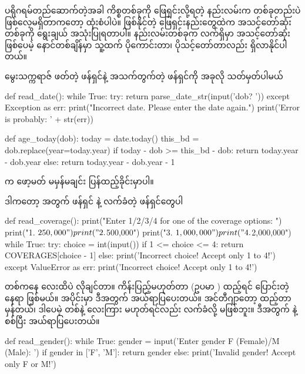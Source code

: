 ပရိုဂရမ်တည်ဆောက်တဲ့အခါ ကိစ္စတစ်ခုကို ဖြေရှင်းလို့ရတဲ့ နည်းလမ်းက တစ်ခုတည်းပဲ ဖြစ်လေ့မရှိတာကတော့ ထုံးစံပါပဲ။ ဖြစ်နိုင်တဲ့ ဖြေရှင်းနည်းတွေထဲက အသင့်တော်ဆုံးတစ်ခုကို ရွေးချယ် အသုံးပြုရတာပါ။ နည်းလမ်းတစ်ခုက လက်ရှိမှာ အသင့်တော်ဆုံး ဖြစ်ပေမဲ့ နောင်တစ်ချိန်မှာ သူ့ထက် ပိုကောင်းတာ၊ ပိုသင့်တော်တာလည်း ရှိလာနိုင်ပါတယ်။

မွေးသက္ကရာဇ် ဖတ်တဲ့ ဖန်ရှင်နဲ့ အသက်တွက်တဲ့ ဖန်ရှင်ကို အခုလို သတ်မှတ်ပါမယ်
%
\begin{py}
def read_date():
    while True:
        try:
            return parse_date_str(input('dob? '))
        except Exception as err:
            print("Incorrect date. Please enter the date again.")
            print('Error is probably: ' + str(err))

def age_today(dob):
    today = date.today()
    this_bd = dob.replace(year=today.year)
    if today - dob >= this_bd - dob:
        return today.year - dob.year
    else:
        return today.year - dob.year - 1
\end{py}
%
 က ဖော့မတ် မမှန်မချင်း ပြန်ထည့်ခိုင်းမှာပါ။

ဒါကတော့  အတွက် ဖန်ရှင် နဲ့  လက်ခံတဲ့ ဖန်ရှင်တွေပါ
%
\begin{py}
def read_coverage():
    print("Enter 1/2/3/4 for one of the coverage options: ")
    print("1. $250,000")
    print("2. $500,000")
    print("3. $1,000,000")
    print("4. $2,000,000")
    while True:
        try:
            choice = int(input())
            if 1 <= choice <= 4:
                return COVERAGES[choice - 1]
            else:
                print('Incorrect choice! Accept only 1 to 4!')
        except ValueError as err:
            print('Incorrect choice! Accept only 1 to 4!')
\end{py}
တစ်ကနေ လေးထိပဲ လိုချင်တာ။ ကိန်းပြည့်မဟုတ်တာ (ဥပမာ \fEn{,} ) ထည့်ရင်  ပြောင်းတဲ့နေရာ  ဖြစ်မယ်။  အပိုင်းမှာ ဒီအတွက် အယ်ရာပြပေးတယ်။ အင်တီဂျာတော့ ထည့်တာမှန်တယ်၊ ဒါပေမဲ့ တစ်နဲ့ လေးကြား မဟုတ်ရင်လည်း လက်ခံလို့ မဖြစ်ဘူး။ ဒီအတွက်  နဲ့ စစ်ပြီး အယ်ရာပြပေးတယ်။
\begin{py}
def read_gender():
    while True:
        gender = input('Enter gender F (Female)/M (Male): ')
        if gender in ['F', 'M']:
            return gender
        else:
            print('Invalid gender! Accept only F or M!')
\end{py}
%


